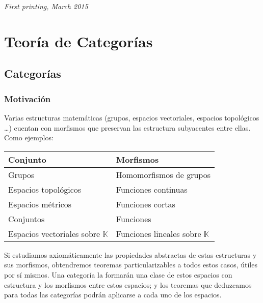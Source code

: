 \documentclass[11pt, fleqn, spanish]{book}
\begin{document}
\noindent \textit{First printing, March 2015} %


\pagestyle{empty} %
\tableofcontents %
\cleardoublepage %
\pagestyle{fancy} %


\part{Teoría de Categorías}



\chapter{Categorías}
  \section{Motivación}
    Varias estructuras matemáticas (grupos, espacios vectoriales, espacios topológicos \dots) cuentan
    con morfismos que preservan las estructura subyacentes entre ellas. Como ejemplos:
    \begin {center}
    \begin{tabular}{l|l}
      Conjunto & Morfismos \\
      \hline
      Grupos & Homomorfismos de grupos \\
      Espacios topológicos & Funciones continuas \\
      Espacios métricos & Funciones cortas \\
      Conjuntos & Funciones \\
      Espacios vectoriales sobre $\mathbb{K}$ & Funciones lineales sobre $\mathbb{K}$ \\
    \end{tabular}
    \end{center}
    Si estudiamos axiomáticamente las propiedades abstractas de estas estructuras y sus morfismos,
    obtendremos teoremas particularizables a todos estos casos, útiles por sí mismos.
    Una categoría la formarán una clase de estos espacios con estructura y los morfismos entre estos
    espacios; y los teoremas que deduzcamos para todas las categorías podrán aplicarse a cada uno de
    los espacios.
\end{document}
